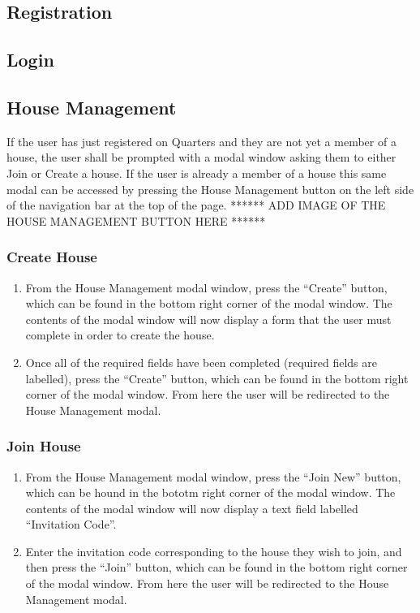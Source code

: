 \documentclass[12pt]{article}
\begin{document}
\subsection{Registration}
\subsection{Login}

\subsection{House Management} %
If the user has just registered on Quarters and they are not yet a member of a house, the user shall be prompted with a modal window asking them to either Join or Create a house. If the user is already a member of a house this same modal can be accessed by pressing the House Management button on the  left side of the navigation bar at the top of the page. ****** ADD IMAGE OF THE HOUSE MANAGEMENT BUTTON HERE ******

\subsubsection{Create House}
\begin{enumerate}
\item From the House Management modal window, press the ``Create'' button, which can be found in the bottom right corner of the modal window. The contents of the modal window will now display a form that the user must complete in order to create the house.
\item Once all of the required fields have been completed (required fields are labelled), press the ``Create'' button, which can be found in the bottom right corner of the modal window. From here the user will be redirected to the House Management modal.
\end{enumerate}

\subsubsection{Join House}
\begin{enumerate}
\item From the House Management modal window, press the ``Join New'' button, which can be hound in the bototm right corner of the modal window. The contents of the modal window will now display a text field labelled ``Invitation Code''.
\item Enter the invitation code corresponding to the house they wish to join, and then press the ``Join'' button, which can be found in the bottom right corner of the modal window. From here the user will be redirected to the House Management modal.
\end{enumerate}
\end{document}

